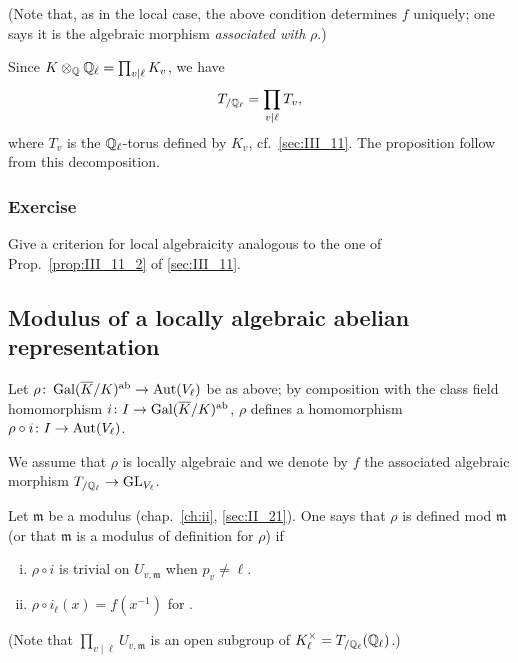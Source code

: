 (Note that, as in the local case, the above condition determines $f$ uniquely;
one says it is the algebraic morphism \emph{associated with} $\rho$.)

Since $K \otimes_{\mathbb{Q}} \mathbb{Q}_\ell = \prod_{v \mid \ell} K_v$, we have 
\[
T_{/\mathbb{Q}_\ell} = \prod_{v \mid \ell} T_v,
\]
where $T_v$ is the $\mathbb{Q}_\ell$-torus defined by $K_v$, cf.~\ref{sec:III_11}. The 
proposition follow from this decomposition. 

\subsubsection*{Exercise}
Give a criterion for local algebraicity analogous to the one of
Prop.~\ref{prop:III_11_2} of \ref{sec:III_11}.

\subsection{Modulus of a locally algebraic abelian representation}
\label{sec:III_22}
Let $\rho\colon \operatorname{Gal}(\overline{K}/K)^{\mathrm{ab}} \to \operatorname{Aut}(V_\ell)$ be as above; by
composition with the class field homomorphism $i\colon I \to \operatorname{Gal}(\overline{K}/K)^{\mathrm{ab}}$, $\rho$ defines a homomorphism $\rho \circ i\colon I \to \operatorname{Aut}(V_\ell)$.

We assume that $\rho$ is locally algebraic and we denote by $f$ the associated
\dpage
algebraic morphism $T_{/\mathbb{Q}_\ell} \to \operatorname{GL}_{V_\ell}$.
\begin{mydef}
Let $\mathfrak{m}$ be a modulus (chap.~\ref{ch:ii}, \ref{sec:II_21}).
\label{errata:modulus21}%
One says that $\rho$ is defined mod $\mathfrak{m}$ (or that
$\mathfrak{m}$ is a modulus of definition for $\rho$) if
\begin{enumerate}[(i)]
	\item $\rho \circ i$ is trivial on $U_{v, \mathfrak{m}}$ when $p_v \ne
		\ell$.
	\item $\rho \circ i_\ell(x) = f(x^{-1})$ for .
\end{enumerate}
\end{mydef}
(Note that $\prod_{v\mid\ell} U_{v, \mathfrak{m}}$ is an open subgroup of
$K_\ell^\times = T_{/\mathbb{Q}_\ell}(\mathbb{Q}_\ell)$.)

